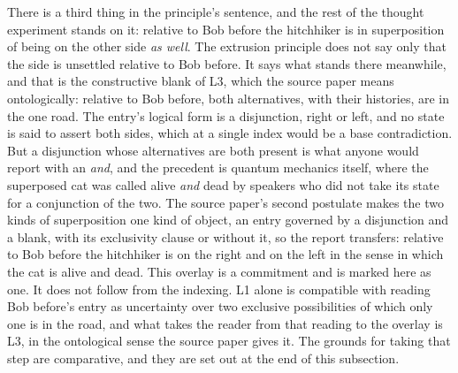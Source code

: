 There is a third thing in the principle's sentence, and the rest of the thought experiment stands on it: relative to Bob before the hitchhiker is in superposition of being on the other side \emph{as well}. The extrusion principle does not say only that the side is unsettled relative to Bob before. It says what stands there meanwhile, and that is the constructive blank of L3, which the source paper means ontologically: relative to Bob before, both alternatives, with their histories, are in the one road. The entry's logical form is a disjunction, right or left, and no state is said to assert both sides, which at a single index would be a base contradiction. But a disjunction whose alternatives are both present is what anyone would report with an \emph{and}, and the precedent is quantum mechanics itself, where the superposed cat was called alive \emph{and} dead by speakers who did not take its state for a conjunction of the two. The source paper's second postulate makes the two kinds of superposition one kind of object, an entry governed by a disjunction and a blank, with its exclusivity clause or without it, so the report transfers: relative to Bob before the hitchhiker is on the right and on the left in the sense in which the cat is alive and dead. This overlay is a commitment and is marked here as one. It does not follow from the indexing. L1 alone is compatible with reading Bob before's entry as uncertainty over two exclusive possibilities of which only one is in the road, and what takes the reader from that reading to the overlay is L3, in the ontological sense the source paper gives it. The grounds for taking that step are comparative, and they are set out at the end of this subsection.

